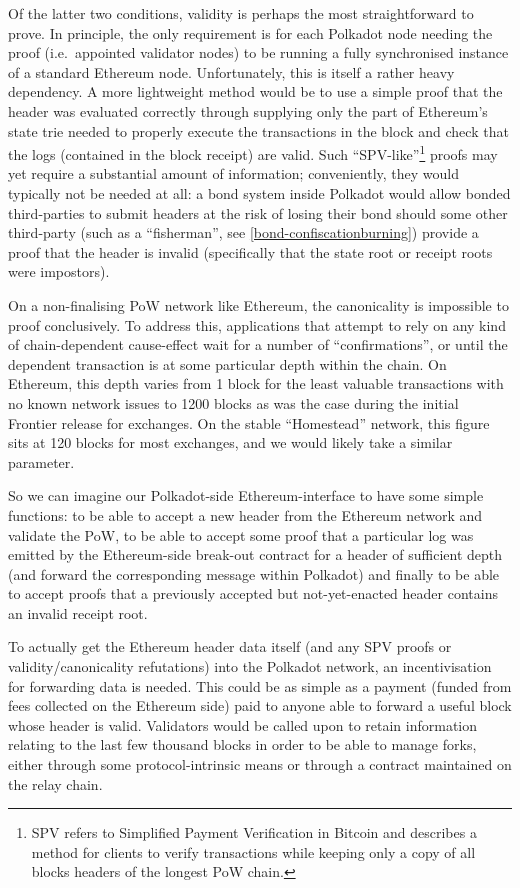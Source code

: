 \documentclass[9pt,oneside]{amsart}
\begin{document}
\begin{multicols}{2}
 Of the latter two conditions, validity is perhaps the most straightforward to prove. In principle, the only requirement is for each Polkadot node needing the proof (i.e.~appointed validator nodes) to be running a fully synchronised instance of a standard Ethereum node. Unfortunately, this is itself a rather heavy dependency. A more lightweight method would be to use a simple proof that the header was evaluated correctly through supplying only the part of Ethereum's state trie needed to properly execute the transactions in the block and check that the logs (contained in the block receipt) are valid. Such ``SPV-like''\footnote{SPV refers to Simplified Payment Verification in Bitcoin and describes a method for clients to verify transactions while keeping only a copy of all blocks headers of the longest PoW chain.} proofs may yet require a substantial amount of information; conveniently, they would typically not be needed at all: a bond system inside Polkadot would allow bonded third-parties to submit headers at the risk of losing their bond should some other third-party (such as a ``fisherman'', see \ref{bond-confiscationburning}) provide a proof that the header is invalid (specifically that the state root or receipt roots were impostors).

 On a non-finalising PoW network like Ethereum, the canonicality is impossible to proof conclusively. To address this, applications that attempt to rely on any kind of chain-dependent cause-effect wait for a number of ``confirmations'', or until the dependent transaction is at some particular depth within the chain. On Ethereum, this depth varies from 1 block for the least valuable transactions with no known network issues to 1200 blocks as was the case during the initial Frontier release for exchanges. On the stable ``Homestead'' network, this figure sits at 120 blocks for most exchanges, and we would likely take a similar parameter.

 So we can imagine our Polkadot-side Ethereum-interface to have some simple functions: to be able to accept a new header from the Ethereum network and validate the PoW, to be able to accept some proof that a particular log was emitted by the Ethereum-side break-out contract for a header of sufficient depth (and forward the corresponding message within Polkadot) and finally to be able to accept proofs that a previously accepted but not-yet-enacted header contains an invalid receipt root.

 To actually get the Ethereum header data itself (and any SPV proofs or validity/canonicality refutations) into the Polkadot network, an incentivisation for forwarding data is needed. This could be as simple as a payment (funded from fees collected on the Ethereum side) paid to anyone able to forward a useful block whose header is valid. Validators would be called upon to retain information relating to the last few thousand blocks in order to be able to manage forks, either through some protocol-intrinsic means or through a contract maintained on the relay chain.


\end{multicols}
\end{document}
